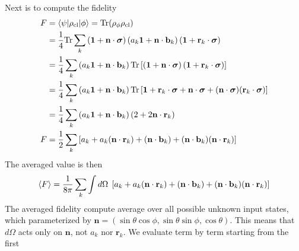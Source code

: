 \documentclass[../../../main.tex]{subfiles}
\begin{document}
Next is to compute the fidelity
\begin{align*}
  F & =  \braket{\psi| \rho_\text{cl} | \phi} = \mathrm{Tr} (\rho_{\phi}\rho_\text{cl} )                                                                                                                                                                                                         \\
    & = \frac{1 }{4 } \mathrm{Tr} \sum_k \left( \mathbf{1} + \mathbf{n }\cdot \boldsymbol{\sigma} \right) \left( a_k  \mathbf{1}+ \mathbf{n }\cdot \mathbf{b}_k \right)    (\mathbf{1 }+ \mathbf{r}_k \cdot \boldsymbol{\sigma})                                                                 \\
    & = \frac{1 }{4 } \sum_k \left( a_k  \mathbf{1}+ \mathbf{n }\cdot \mathbf{b}_k \right) \mathrm{Tr}  \left[\left( \mathbf{1} + \mathbf{n }\cdot \boldsymbol{\sigma} \right) (\mathbf{1 }+ \mathbf{r}_k \cdot \boldsymbol{\sigma})\right]                                                      \\
    & = \frac{1 }{4 } \sum_k \left( a_k  \mathbf{1}+ \mathbf{n }\cdot \mathbf{b}_k \right) \mathrm{Tr}  \left[\mathbf{1} + \mathbf{r}_k \cdot \boldsymbol{\sigma} + \mathbf{n }\cdot \boldsymbol{\sigma} + (\mathbf{n }\cdot \boldsymbol{\sigma})(\mathbf{r}_k \cdot \boldsymbol{\sigma})\right] \\
    & = \frac{1 }{4 } \sum_k \left( a_k  \mathbf{1}+ \mathbf{n }\cdot \mathbf{b}_k \right) \left( 2 + 2 \mathbf{n }\cdot \mathbf{r}_k\right)                                                                                                                                                     \\
  F & = \frac{1 }{2 }  \sum_k\left[ a_k + a_k(\mathbf{n }\cdot \mathbf{r }_k) + (\mathbf n\cdot\mathbf b_k) + (\mathbf n\cdot\mathbf b_k)(\mathbf{n }\cdot \mathbf{r }_k)\right]
\end{align*}
The averaged value is then
\begin{equation*}
  \braket{F } = \frac{1 }{8 \pi } \sum_{k} \int d\Omega\;\left[ a_k + a_k(\mathbf{n }\cdot \mathbf{r }_k) + (\mathbf n\cdot\mathbf b_k) + (\mathbf n\cdot\mathbf b_k)(\mathbf{n }\cdot \mathbf{r }_k)\right]
\end{equation*}
The averaged fidelity compute average over all possible unknown input states, which parameterized by $\mathbf{n} = (\sin \theta \cos \phi,\sin \theta \sin\phi,\cos \theta)$.
This means that $d\Omega$ acts only on $\mathbf{n}$, not $a_k$ nor $\mathbf{r}_k$.
We evaluate term by term starting from the first
\end{document}
